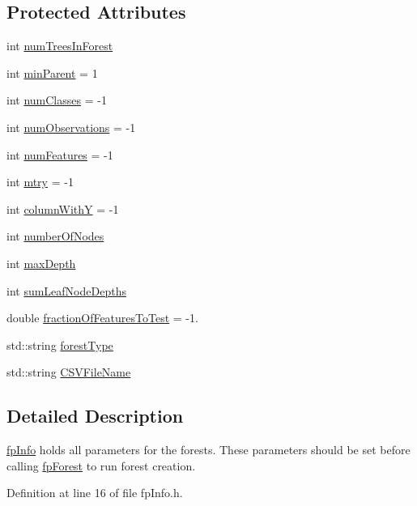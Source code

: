 \subsection*{Protected Attributes}
\begin{DoxyCompactItemize}
\item 
int \hyperlink{classfp_1_1fpInfo_a8dbd62dca5c972c29d29a69d90ca2632}{num\+Trees\+In\+Forest}
\item 
int \hyperlink{classfp_1_1fpInfo_a128fab7ba6da0fc76da00b48bb1bd7d5}{min\+Parent} = 1
\item 
int \hyperlink{classfp_1_1fpInfo_a1c98a9ced12230f21003f78d742625a3}{num\+Classes} = -\/1
\item 
int \hyperlink{classfp_1_1fpInfo_a1b35cd17d4ddb35e232246a6549d7a74}{num\+Observations} = -\/1
\item 
int \hyperlink{classfp_1_1fpInfo_a6ed8deabebae772fc213730cd29a2e61}{num\+Features} = -\/1
\item 
int \hyperlink{classfp_1_1fpInfo_a62cccc1eb5641ebec2a6cc86cf03eedf}{mtry} = -\/1
\item 
int \hyperlink{classfp_1_1fpInfo_ac29e135cd84cdef547b678e7ea37f92d}{column\+WithY} = -\/1
\item 
int \hyperlink{classfp_1_1fpInfo_a9404de3ad49dc78e3d5c8e3ef8b04fba}{number\+Of\+Nodes}
\item 
int \hyperlink{classfp_1_1fpInfo_a95c744fa049788dd61fa0fccdec4565d}{max\+Depth}
\item 
int \hyperlink{classfp_1_1fpInfo_a13afa17097728f059e8525ea382b71cd}{sum\+Leaf\+Node\+Depths}
\item 
double \hyperlink{classfp_1_1fpInfo_ab949cb97523283367e9b120fd78e3c3b}{fraction\+Of\+Features\+To\+Test} = -\/1.
\item 
std\+::string \hyperlink{classfp_1_1fpInfo_a3001fbf80d86022e53578d6adf133b90}{forest\+Type}
\item 
std\+::string \hyperlink{classfp_1_1fpInfo_aac01e5ddb27bc333e172a0422066af1c}{C\+S\+V\+File\+Name}
\end{DoxyCompactItemize}


\subsection{Detailed Description}
\hyperlink{classfp_1_1fpInfo}{fp\+Info} holds all parameters for the forests. These parameters should be set before calling \hyperlink{classfp_1_1fpForest}{fp\+Forest} to run forest creation. 

Definition at line 16 of file fp\+Info.\+h.



